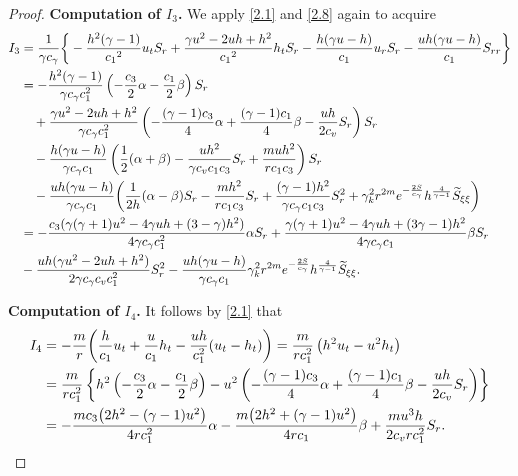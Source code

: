 \documentclass[10pt,a4paper]{amsart}
\begin{document}
\begin{proof}
\noindent\textbf{Computation of $I_3$.}
We apply \eqref{2.1} and \eqref{2.8} again to acquire
\begin{align}
I_3 &= \frac{1}{\gamma c_\gamma}\bigg\{
       -\frac{h^2(\gamma-1)}{{c_1}^2}u_tS_r+\frac{\gamma u^2-2uh+h^2}{{c_1}^2}h_tS_r- \frac{h(\gamma u-h)}{c_1}u_rS_r-
       \frac{uh(\gamma u-h)}{c_1}S_{rr}\bigg\}\nonumber\\
       &=
-\frac{h^2(\gamma-1)}{\gamma c_\gamma c_1^2}\left( -\frac{c_3}{2}\alpha - \frac{c_1}{2}\beta \right)S_r \nonumber \\
&\quad +\frac{\gamma u^2-2uh+h^2}{\gamma c_\gamma c_1^2}\left( -\frac{(\gamma-1)c_3}{4}\alpha + \frac{(\gamma-1)c_1}{4}\beta - \frac{uh}{2c_v} S_r \right)S_r \notag \\
&\quad - \frac{h(\gamma u-h)}{\gamma c_\gamma c_1}\left( \frac12(\alpha+\beta) - \frac{uh^2}{\gamma c_v c_1 c_3} S_r + \frac{m u h^2}{r c_1 c_3} \right)S_r \nonumber \\
&\quad -\frac{uh(\gamma u-h)}{\gamma c_\gamma c_1}\bigg( \frac{1}{2h}(\alpha-\beta) S_r - \frac{m h^2}{r c_1 c_3} S_r + \frac{(\gamma-1) h^2}{\gamma c_\gamma c_1 c_3} S_r^2 \notag + \gamma_k^2 r^{2m} e^{-\frac{2S}{c_\gamma}} h^{\frac{4}{\gamma-1}} \widetilde{S}_{\xi\xi} \bigg)
\\
&= -\frac{c_3(\gamma(\gamma+1)u^2-4\gamma uh + (3-\gamma)h^2)}{4\gamma c_\gamma c_1^2}\alpha S_r
    + \frac{\gamma(\gamma+1)u^2-4\gamma uh+(3\gamma-1)h^2}{4\gamma c_\gamma c_1}\beta S_r
    \nonumber\\
    &-\frac{uh(\gamma u^2-2uh+h^2)}{2\gamma c_\gamma c_vc_1^2} S_r^2
    -\frac{uh(\gamma u-h)}{\gamma c_\gamma c_1} \gamma_k^2 r^{2m} e^{-\frac{2S}{c_\gamma}} h^{\frac{4}{\gamma-1}}  \widetilde{S}_{\xi\xi}. \notag
\end{align}


\noindent\textbf{Computation of $I_4$.}
It follows by \eqref{2.1} that
 \begin{align}
 I_4 &= -\frac{m}{r}\bigg(\frac{h}{c_1}u_t+\frac{u}{c_1}h_t-\frac{uh}{c_1^2}(u_t-h_t)\bigg)= \frac{m}{r c_1^2}\left( h^2 u_t - u^2 h_t \right) \nonumber\\
    &= \frac{m}{r c_1^2}\left\{ h^2\left( -\frac{c_3}{2}\alpha - \frac{c_1}{2}\beta \right) - u^2\left( -\frac{(\gamma-1)c_3}{4}\alpha + \frac{(\gamma-1)c_1}{4}\beta - \frac{u h}{2c_v} S_r \right) \right\} \nonumber\\
    &= -\frac{m c_3\big( 2h^2 - (\gamma-1)u^2 \big)}{4r c_1^2} \alpha - \frac{m\big( 2h^2 + (\gamma-1)u^2 \big)}{4r c_1} \beta + \frac{m u^3 h}{2c_v r c_1^2} S_r. \notag
 \end{align}


\end{proof}
\end{document}
